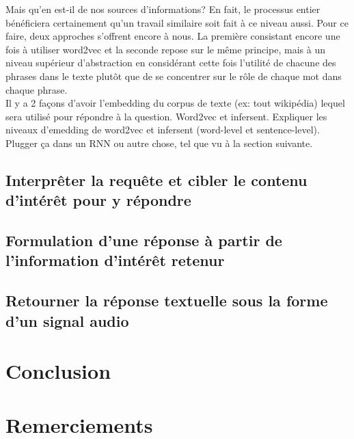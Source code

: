 \documentclass[11pt]{article}
\begin{document}
Mais qu'en est-il de nos sources d'informations? En fait, le processus entier bénéficiera certainement qu'un travail similaire soit fait à ce niveau aussi. Pour ce faire, deux approches s'offrent encore à nous. La première consistant encore une fois à utiliser word2vec et la seconde repose sur le même principe, mais à un niveau supérieur d'abstraction en considérant cette fois l'utilité de chacune des phrases dans le texte plutôt que de se concentrer sur le rôle de chaque mot dans chaque phrase.  \\

Il y a 2 façons d’avoir l’embedding du corpus de texte (ex: tout wikipédia) lequel sera utilisé pour répondre à la question. Word2vec et infersent. Expliquer les niveaux d’emedding de word2vec et infersent (word-level et sentence-level). Plugger ça dans un RNN ou autre chose, tel que vu à la section suivante.

\subsection{Interprêter la requête et cibler le contenu d'intérêt pour y répondre}



\subsection{Formulation d'une réponse à partir de l'information d'intérêt retenur}

\subsection{Retourner la réponse textuelle sous la forme d'un signal audio}

\section*{Conclusion}

\section*{Remerciements}



\end{document}
